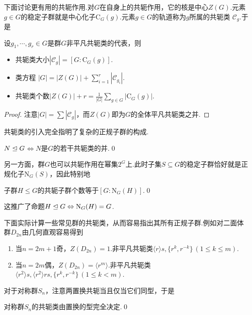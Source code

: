 下面讨论更有用的共轭作用.对$G$在自身上的共轭作用，它的核是中心$Z(G)$.元素$g\in G$的稳定子群就是中心化子$\mathrm{C}_G(g)$.元素$g\in G$的轨道称为$g$所属的{\heiti 共轭类} $\mathcal{C}_g$.于是
\begin{thm}
	设$g_1,\cdots,g_r\in G$是群$G$非平凡共轭类的代表，则
	\begin{itemize}
		\item 共轭类大小$|\mathcal{C}_{g}|=[G:\mathrm{C}_G(g)]$.
		\item {\heiti 类方程} $|G|=|Z(G)|+\displaystyle\sum_{i=1}^r|\mathcal{C}_{g_i}|$.
		\item 共轭类个数$|Z(G)|+r=\displaystyle\frac{1}{|G|}\sum_{g\in G}|\mathrm{C}_G(g)|$.
	\end{itemize}
\end{thm}
\begin{proof}
	注意$|G|=\displaystyle\sum|\mathcal{C}_g|$，而$Z(G)$即为$G$的全体平凡共轭类之并.
\end{proof}

共轭类的引入完全指明了复杂的正规子群的构成.
\begin{thm}
	$N\trianglelefteq G$$\iff$$N$是$G$的若干共轭类的并.\qed
\end{thm}

另一方面，群$G$也可以共轭作用在幂集$2^G$上.此时子集$S\subseteq G$的稳定子群恰好就是正规化子$\mathrm{N}_G(S)$，因此特别地
\begin{thm}
	子群$H\le G$的共轭子群个数等于$[G:\mathrm{N}_G(H)]$.\qed
\end{thm}

这推广了命题$H\trianglelefteq G\Leftrightarrow\mathrm{N}_G(H)=G$.

\medskip 下面实际计算一些常见群的共轭类，从而容易指出其所有正规子群.例如对二面体群$D_{2n}$由几何直观容易得到
\begin{enumerate}
	\item 当$n=2m+1$奇，$Z(D_{2n})=1$.非平凡共轭类$\langle r\rangle s,\{r^k,r^{-k}\}\,(1\le k\le m)$.
	\item 当$n=2m$偶，$Z(D_{2n})=\langle r^m\rangle $.非平凡共轭类$\langle r^2\rangle s,\langle r^2\rangle rs,\{r^k,r^{-k}\}\,(1\le k<m)$.
\end{enumerate}

对于对称群$S_n$，注意两置换共轭当且仅当它们同型，于是
\begin{prop}
	对称群$S_n$的共轭类由置换的型完全决定.\qed
\end{prop}

